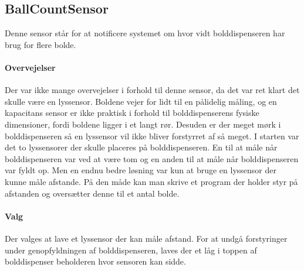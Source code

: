 \documentclass[Rapport/Rapport_main.tex]{subfiles}
\begin{document}
\subsection{BallCountSensor}\label{sec:BallCountSensor}
Denne sensor står for at notificere systemet om hvor vidt bolddispenseren har brug for flere bolde.

\paragraph{Overvejelser}
\newline\newline
Der var ikke mange overvejelser i forhold til denne sensor, da det var ret klart det skulle være en lyssensor. Boldene vejer for lidt til en pålidelig måling, og en kapacitans sensor er ikke praktisk i forhold til bolddispenserens fysiske dimensioner, fordi boldene ligger i et langt rør. Desuden er der meget mørk i bolddispenseren så en lyssensor vil ikke bliver forstyrret af så meget. I starten var det to lyssensorer der skulle placeres på bolddispenseren. En til at måle når bolddispenseren var ved at være tom og en anden til at måle når bolddispenseren var fyldt op. Men en endnu bedre løsning var kun at bruge en lyssensor der kunne måle afstande. På den måde kan man skrive et program der holder styr på afstanden og oversætter denne til et antal bolde.

\paragraph{Valg}
\newline\newline
Der valges at lave et lyssensor der kan måle afstand. For at undgå forstyringer under genopfyldningen af bolddispenseren, laves der et låg i toppen af bolddispenser beholderen hvor sensoren kan sidde.
\end{document}
